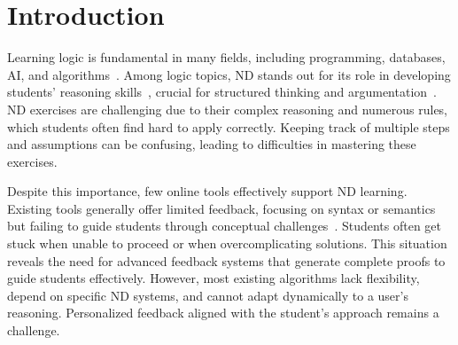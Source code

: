 
\section{Introduction}

Learning logic is fundamental in many fields, including programming, databases, AI, and algorithms~\cite{logicincomputer}. Among logic topics, ND stands out for its role in developing students’ reasoning skills~\cite{autogeneratingnd}, crucial for structured thinking and argumentation~\cite{vonPlato_2014}. ND exercises are challenging due to their complex reasoning and numerous rules, which students often find hard to apply correctly. Keeping track of multiple steps and assumptions can be confusing, leading to difficulties in mastering these exercises.


Despite this importance, few online tools effectively support ND learning. Existing tools generally offer limited feedback, focusing on syntax or semantics but failing to guide students through conceptual challenges~\cite{Perh__2025}. Students often get stuck when unable to proceed or when overcomplicating solutions. This situation reveals the need for advanced feedback systems that generate complete proofs to guide students effectively. However, most existing algorithms lack flexibility, depend on specific ND systems, and cannot adapt dynamically to a user’s reasoning. Personalized feedback aligned with the student’s approach remains a challenge.

